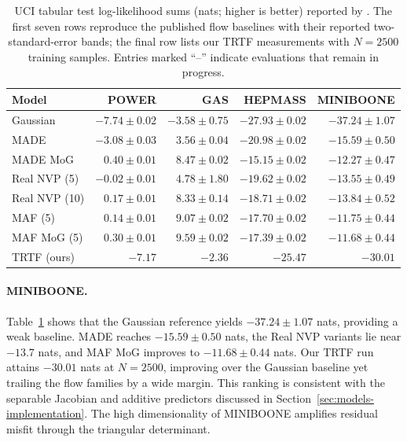 \documentclass[11pt,a4paper,twoside]{book}\usepackage[]{graphicx}\usepackage[]{xcolor}
\begin{document}
\begin{table}[htbp]
  \centering
  \caption{UCI tabular test log-likelihood sums (nats; higher is better) reported by \citet{papamakarios2017masked}. The first seven rows reproduce the published flow baselines with their reported two-standard-error bands; the final row lists our TRTF measurements with $N=2500$ training samples. Entries marked ``--'' indicate evaluations that remain in progress.}
  \label{tab:uci-loglik}
  \begin{tabular}{lrrrr}
    \hline
    Model & POWER & GAS & HEPMASS & MINIBOONE \\
    \hline
    Gaussian          & $-7.74 \pm 0.02$ & $-3.58 \pm 0.75$ & $-27.93 \pm 0.02$ & $-37.24 \pm 1.07$ \\
    MADE              & $-3.08 \pm 0.03$ & $ 3.56 \pm 0.04$ & $-20.98 \pm 0.02$ & $-15.59 \pm 0.50$ \\
    MADE MoG          & $ 0.40 \pm 0.01$ & $ 8.47 \pm 0.02$ & $-15.15 \pm 0.02$ & $-12.27 \pm 0.47$ \\
    Real NVP (5)      & $-0.02 \pm 0.01$ & $ 4.78 \pm 1.80$ & $-19.62 \pm 0.02$ & $-13.55 \pm 0.49$ \\
    Real NVP (10)     & $ 0.17 \pm 0.01$ & $ 8.33 \pm 0.14$ & $-18.71 \pm 0.02$ & $-13.84 \pm 0.52$ \\
    MAF (5)           & $ 0.14 \pm 0.01$ & $ 9.07 \pm 0.02$ & $-17.70 \pm 0.02$ & $-11.75 \pm 0.44$ \\
    MAF MoG (5)       & $ 0.30 \pm 0.01$ & $ 9.59 \pm 0.02$ & $-17.39 \pm 0.02$ & $-11.68 \pm 0.44$ \\
    TRTF (ours)    & $-7.17$ & $-2.36$ & $-25.47$ & $-30.01$ \\
    \hline
  \end{tabular}
\end{table}

\paragraph{MINIBOONE.} Table~\ref{tab:uci-loglik} shows that the Gaussian reference yields $-37.24 \pm 1.07$ nats, providing a weak baseline. MADE reaches $-15.59 \pm 0.50$ nats, the Real NVP variants lie near $-13.7$ nats, and MAF MoG improves to $-11.68 \pm 0.44$ nats. Our TRTF run attains $-30.01$ nats at $N=2500$, improving over the Gaussian baseline yet trailing the flow families by a wide margin. This ranking is consistent with the separable Jacobian and additive predictors discussed in Section~\ref{sec:models-implementation}. The high dimensionality of MINIBOONE amplifies residual misfit through the triangular determinant.
\end{document}
